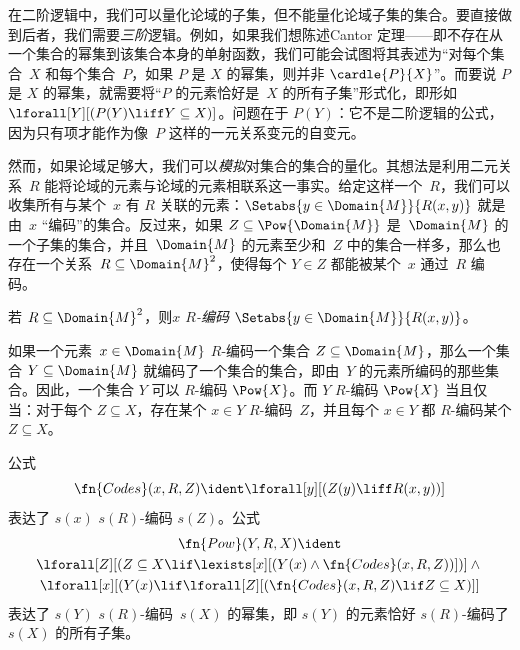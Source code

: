 \documentclass[../../../include/open-logic-section]{subfiles}
\begin{document}


\begin{explain}
在二阶逻辑中，我们可以量化论域的子集，但不能量化论域子集的集合。要直接做到后者，我们需要\emph{三阶}逻辑。例如，如果我们想陈述Cantor 定理——即不存在从一个集合的幂集到该集合本身的单射函数，我们可能会试图将其表述为“对每个集合~$X$ 和每个集合~$P$，如果 $P$ 是 $X$ 的幂集，则并非 $\cardle{P}{X}$”。而要说 $P$ 是 $X$ 的幂集，就需要将“$P$ 的元素恰好是~$X$ 的所有子集”形式化，即形如 $\lforall[Y][(P(Y)
  \liff Y \subseteq X)]$。问题在于 $P(Y)$：它不是二阶逻辑的公式，因为只有项才能作为像~$P$ 这样的一元关系变元的自变元。

然而，如果论域足够大，我们可以\emph{模拟}对集合的集合的量化。其想法是利用二元关系~$R$ 能将论域的元素与论域的元素相联系这一事实。给定这样一个~$R$，我们可以收集所有与某个~$x$ 有 $R$ 关联的元素：$\Setabs{y \in
  \Domain{M}}{R(x,y)}$ 就是由~$x$ “编码”的集合。反过来，如果 $Z \subseteq \Pow{\Domain{M}}$ 是~$\Domain{M}$ 的一个子集的集合，并且~$\Domain{M}$ 的元素至少和~$Z$ 中的集合一样多，那么也存在一个关系~$R \subseteq \Domain{M}^2$，使得每个 $Y \in Z$ 都能被某个~$x$ 通过~$R$ 编码。
\end{explain}

\begin{defn}
若 $R \subseteq \Domain{M}^2$，则\emph{$x$ $R$-编码} $\Setabs{y
  \in \Domain{M}}{R(x, y)}$。
\end{defn}

如果一个元素~$x \in \Domain{M}$ $R$-编码一个集合 $Z \subseteq \Domain{M}$，那么一个集合 $Y \subseteq \Domain{M}$ 就编码了一个集合的集合，即由~$Y$ 的元素所编码的那些集合。因此，一个集合 $Y$ 可以 $R$-编码 $\Pow{X}$。而 $Y$ $R$-编码 $\Pow{X}$ 当且仅当：对于每个 $Z \subseteq X$，存在某个 $x \in Y$ $R$-编码~$Z$，并且每个 $x \in Y$ 都 $R$-编码某个 $Z \subseteq X$。

\begin{prop}
公式
  \[
  \fn{Codes}(x, R, Z) \ident \lforall[y][(Z(y) \liff
    R(x, y))]
  \]
表达了 $s(x)$ $s(R)$-编码 $s(Z)$。公式
\begin{multline*}
  \fn{Pow}(Y, R, X) \ident \\
  \lforall[Z][(Z \subseteq X \lif \lexists[x][(Y(x) \land
    \fn{Codes}(x, R, Z))])] \land {} \\ \lforall[x][(Y(x) \lif
  \lforall[Z][(\fn{Codes}(x, R, Z) \lif Z \subseteq X)]]
\end{multline*}
表达了 $s(Y)$ $s(R)$-编码~$s(X)$ 的幂集，即 $s(Y)$ 的元素恰好 $s(R)$-编码了 $s(X)$ 的所有子集。
\end{prop}
\end{document}

